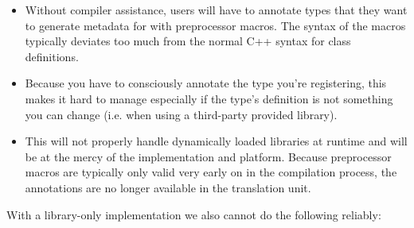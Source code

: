 \begin{itemize}

 \item Without compiler assistance, users will have to annotate types that
they want to generate metadata for with preprocessor macros. The syntax of the
macros typically deviates too much from the normal C++ syntax for class
definitions.

 \item Because you have to consciously annotate the type you’re registering,
this makes it hard to manage especially if the type’s definition is not
something you can change (i.e. when using a third-party provided library).

 \item This will not properly handle dynamically loaded libraries at runtime
and will be at the mercy of the implementation and platform. Because
preprocessor macros are typically only valid very early on in the compilation
process, the annotations are no longer available in the translation unit.

\end{itemize}

With a library-only implementation we also cannot do the following reliably:

